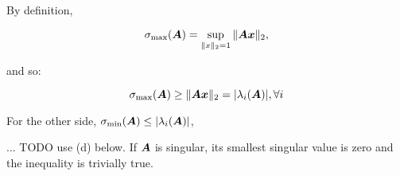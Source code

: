\documentclass[twoside,10pt]{article}
\begin{document}
  By definition,
 
\begin{equation*}
\sigma_{\mathrm{max}}(\bm{A}) = \sup_{\|x\|_2 = 1}{\|\bm{A}\bm{x}\|_2},
\end{equation*}

and so:
  
\begin{equation*}
  \sigma_{\mathrm{max}}(\bm{A}) \geq \|\bm{A}\bm{x}\|_2 = |\lambda_i(\bm{A})|, \forall i
\end{equation*}

For the other side, $\sigma_{\mathrm{min}}(\mtx{A}) \leq \left|\lambda_{i}\left(\mtx{A}\right)\right|$,

... TODO use (d) below. If $\bm{A}$ is singular, its smallest singular value is zero and the inequality is trivially true.
\end{document}
